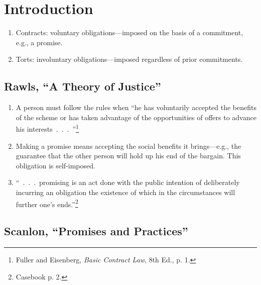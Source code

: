 \section{Introduction}

\begin{enumerate}
    \item Contracts: voluntary obligations---imposed on the basis of a 
    commitment, e.g., a promise.
    \item Torts: involuntary obligations---imposed regardless of prior 
    commitments.
\end{enumerate}

\subsection{Rawls, ``A Theory of Justice''}

\begin{enumerate}
    \item A person must follow the rules when ``he has voluntarily accepted 
    the benefits of the scheme or has taken advantage of the opportunities of 
    offers to advance his interests~.~.~.~''\footnote{Fuller and Eisenberg, 
    \emph{Basic Contract Law}, 8th Ed., p. 1.}
    \item Making a promise means accepting the social benefits it 
    brings---e.g., the guarantee that the other person will hold up his end of 
    the bargain. This obligation is self-imposed.
    \item ``~.~.~.~promising is an act done with the public intention of 
    deliberately incurring an obligation the existence of which in the 
    circumstances will further one's ends.''\footnote{Casebook p. 2.}
\end{enumerate}

\subsection{Scanlon, ``Promises and Practices''}

